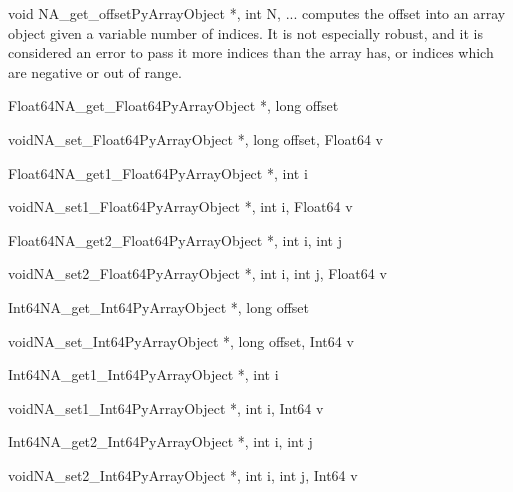 \begin{cfuncdesc}{}{void NA_get_offset}{PyArrayObject *, int N, ...}
   computes the offset into an array object given a
  variable number of indices.  It is not especially robust, and it is
  considered an error to pass it more indices than the array has, or indices
  which are negative or out of range.
\end{cfuncdesc}

\begin{cfuncdesc}{Float64}{NA_get_Float64}{PyArrayObject *, long offset}
\end{cfuncdesc}
\begin{cfuncdesc}{void}{NA_set_Float64}{PyArrayObject *, long offset, Float64 v}
\end{cfuncdesc}
\begin{cfuncdesc}{Float64}{NA_get1_Float64}{PyArrayObject *, int i}
\end{cfuncdesc}
\begin{cfuncdesc}{void}{NA_set1_Float64}{PyArrayObject *, int i, Float64 v}
\end{cfuncdesc}
\begin{cfuncdesc}{Float64}{NA_get2_Float64}{PyArrayObject *, int i, int j}
\end{cfuncdesc}
\begin{cfuncdesc}{void}{NA_set2_Float64}{PyArrayObject *, int i, int j, Float64 v}
\end{cfuncdesc}

\begin{cfuncdesc}{Int64}{NA_get_Int64}{PyArrayObject *, long offset}
\end{cfuncdesc}
\begin{cfuncdesc}{void}{NA_set_Int64}{PyArrayObject *, long offset, Int64 v}
\end{cfuncdesc}
\begin{cfuncdesc}{Int64}{NA_get1_Int64}{PyArrayObject *, int i}
\end{cfuncdesc}
\begin{cfuncdesc}{void}{NA_set1_Int64}{PyArrayObject *, int i, Int64 v}
\end{cfuncdesc}
\begin{cfuncdesc}{Int64}{NA_get2_Int64}{PyArrayObject *, int i, int j}
\end{cfuncdesc}
\begin{cfuncdesc}{void}{NA_set2_Int64}{PyArrayObject *, int i, int j, Int64 v}
\end{cfuncdesc}

